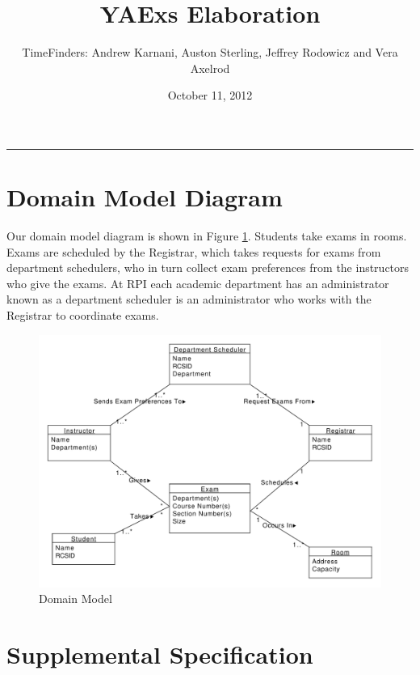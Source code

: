 \documentclass[11pt]{article}
\title{YAExs Elaboration}
\author{TimeFinders: Andrew Karnani, Auston Sterling, Jeffrey Rodowicz and Vera Axelrod}
\date{October 11, 2012}
\newcounter{id}
\begin{document}
\maketitle
\tableofcontents
\vspace{0.2in}
\hrule
\vspace{1in}

\section{Domain Model Diagram} %
Our domain model diagram is shown in Figure \ref{fig:Domain}.  Students take exams in rooms. Exams are scheduled by the Registrar, which takes requests for exams from department schedulers, who in turn collect exam preferences from the instructors who give the exams. At RPI each academic department has an administrator known as a  department scheduler is an administrator who works with the Registrar to coordinate exams.
\begin{figure}
	\centering
		\includegraphics[width = \textwidth]{domainDiagram.pdf}
	\caption{Domain Model}
	\label{fig:Domain}
\end{figure}

\section{Supplemental Specification} %
\end{document}
